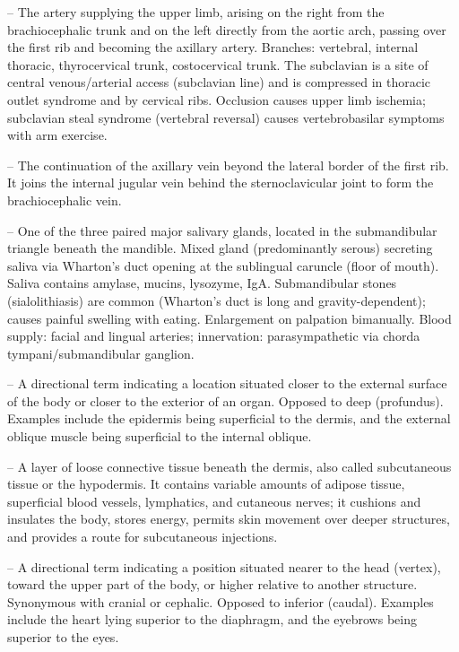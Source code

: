 -- The artery supplying the upper limb, arising on the right from the brachiocephalic trunk and on the left directly from the aortic arch, passing over the first rib and becoming the axillary artery. Branches: vertebral, internal thoracic, thyrocervical trunk, costocervical trunk. The subclavian is a site of central venous/arterial access (subclavian line) and is compressed in thoracic outlet syndrome and by cervical ribs. Occlusion causes upper limb ischemia; subclavian steal syndrome (vertebral reversal) causes vertebrobasilar symptoms with arm exercise.

-- The continuation of the axillary vein beyond the lateral border of the first rib. It joins the internal jugular vein behind the sternoclavicular joint to form the brachiocephalic vein.

-- One of the three paired major salivary glands, located in the submandibular triangle beneath the mandible. Mixed gland (predominantly serous) secreting saliva via Wharton's duct opening at the sublingual caruncle (floor of mouth). Saliva contains amylase, mucins, lysozyme, IgA. Submandibular stones (sialolithiasis) are common (Wharton's duct is long and gravity-dependent); causes painful swelling with eating. Enlargement on palpation bimanually. Blood supply: facial and lingual arteries; innervation: parasympathetic via chorda tympani/submandibular ganglion.

-- A directional term indicating a location situated closer to the external surface of the body or closer to the exterior of an organ. Opposed to deep (profundus). Examples include the epidermis being superficial to the dermis, and the external oblique muscle being superficial to the internal oblique.

-- A layer of loose connective tissue beneath the dermis, also called subcutaneous tissue or the hypodermis. It contains variable amounts of adipose tissue, superficial blood vessels, lymphatics, and cutaneous nerves; it cushions and insulates the body, stores energy, permits skin movement over deeper structures, and provides a route for subcutaneous injections.

-- A directional term indicating a position situated nearer to the head (vertex), toward the upper part of the body, or higher relative to another structure. Synonymous with cranial or cephalic. Opposed to inferior (caudal). Examples include the heart lying superior to the diaphragm, and the eyebrows being superior to the eyes.

